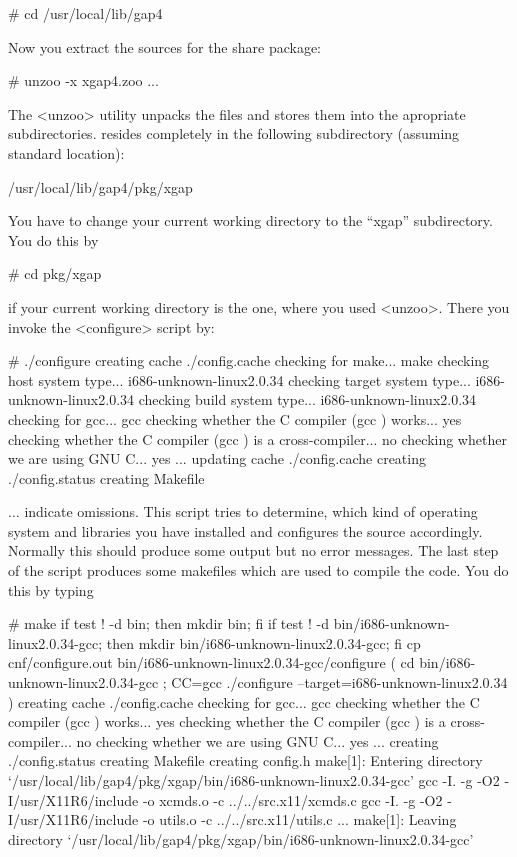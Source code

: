 \begintt
# cd /usr/local/lib/gap4
\endtt

Now you extract the sources for the {\XGAP} share package:

\begintt
# unzoo -x xgap4.zoo
...
\endtt

The <unzoo> utility unpacks the files and stores them into the apropriate
subdirectories. {\XGAP} resides completely in the following subdirectory
(assuming standard location):

\begintt
/usr/local/lib/gap4/pkg/xgap
\endtt


You have to change your current working directory to the ``xgap''
subdirectory. You do this by

\begintt
# cd pkg/xgap
\endtt

if your current working directory is the one, where you used
<unzoo>. There you invoke the <configure> script by:

\begintt
# ./configure
creating cache ./config.cache
checking for make... make
checking host system type... i686-unknown-linux2.0.34
checking target system type... i686-unknown-linux2.0.34
checking build system type... i686-unknown-linux2.0.34
checking for gcc... gcc
checking whether the C compiler (gcc  ) works... yes
checking whether the C compiler (gcc  ) is a cross-compiler... no
checking whether we are using GNU C... yes
...
updating cache ./config.cache
creating ./config.status
creating Makefile
\endtt

$\ldots$ indicate omissions. 
This script tries to determine, which kind of operating system and
libraries you have installed and configures the source
accordingly. Normally this should produce some output but no error
messages. The last step of the script produces some makefiles which are
used to compile the code. You do this by typing

\begintt
# make
if test ! -d bin;  then mkdir bin;  fi
if test ! -d bin/i686-unknown-linux2.0.34-gcc;  then mkdir bin/i686-unknown-linux2.0.34-gcc;  fi
cp cnf/configure.out bin/i686-unknown-linux2.0.34-gcc/configure
( cd bin/i686-unknown-linux2.0.34-gcc ; CC=gcc ./configure --target=i686-unknown-linux2.0.34  )
creating cache ./config.cache
checking for gcc... gcc
checking whether the C compiler (gcc  ) works... yes
checking whether the C compiler (gcc  ) is a cross-compiler... no
checking whether we are using GNU C... yes
...
creating ./config.status
creating Makefile
creating config.h
make[1]: Entering directory `/usr/local/lib/gap4/pkg/xgap/bin/i686-unknown-linux2.0.34-gcc'
gcc -I. -g -O2 -I/usr/X11R6/include  -o xcmds.o -c ../../src.x11/xcmds.c
gcc -I. -g -O2 -I/usr/X11R6/include  -o utils.o -c ../../src.x11/utils.c
...
make[1]: Leaving directory `/usr/local/lib/gap4/pkg/xgap/bin/i686-unknown-linux2.0.34-gcc'
\endtt

